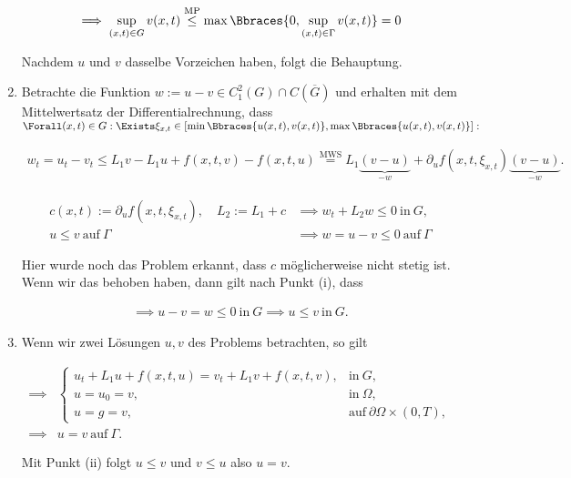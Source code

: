 \begin{solution}
\begin{enumerate}[label = (\roman*)]
  \begin{align*}
    \implies
    \sup_{(x, t) \in G} v(x, t)
    \stackrel{\mathrm{MP}}{\leq}
    \max \Bbraces{0, \sup_{(x, t) \in \Gamma} v(x,t)}
    =
    0
  \end{align*}

  Nachdem $u$ und $v$ dasselbe Vorzeichen haben, folgt die Behauptung.

  \item Betrachte die Funktion $w := u - v \in C_1^2(G) \cap C(\overline{G})$ und erhalten mit dem Mittelwertsatz der Differentialrechnung, dass $\Forall (x, t) \in G: \Exists \xi_{x, t} \in [\min \Bbraces{u(x, t), v(x, t)}, \max \Bbraces{u(x, t), v(x, t)}]:$

  \begin{align*}
    w_t
    =
    u_t - v_t
    \leq
    L_1 v - L_1 u + f(x, t, v) - f(x, t, u)
    \stackrel
    {
      \mathrm{MWS}
    }{=}
    L_1 \underbrace{(v - u)}_{-w} + \partial_u f(x, t, \xi_{x, t}) \underbrace{(v - u)}_{-w}.
  \end{align*}

  \begin{align*}
    c(x, t) := \partial_u f(x, t,\xi_{x, t}),
    \quad
    L_2 := L_1 + c
    & \implies
    w_t + L_2 w \leq 0 ~\text{in}~ G, \\
    u \leq v ~\text{auf}~ \Gamma
    & \implies
    w = u - v \leq 0 ~\text{auf}~ \Gamma
  \end{align*}

  Hier wurde noch das Problem erkannt, dass $c$ möglicherweise nicht stetig ist.
  Wenn wir das behoben haben, dann gilt nach Punkt (i), dass

  \begin{align*}
    \implies
    u - v = w \leq 0 ~\text{in}~ G
    \implies
    u \leq v ~\text{in}~ G.
  \end{align*}

  \item Wenn wir zwei Lösungen $u, v$ des Problems betrachten, so gilt 

  \begin{align*}
    \implies &
    \begin{cases}
      u_t + L_1 u + f(x, t, u) = v_t + L_1 v + f(x, t, v), & \text{in}~ G, \\
      u = u_0 = v,                                         & \text{in}~ \Omega, \\
      u = g = v,                                           & \text{auf}~ \partial \Omega \times (0, T),
    \end{cases} \\
    \implies &
    u = v ~\text{auf}~ \Gamma.
  \end{align*}

  Mit Punkt (ii) folgt $u \leq v$ und $v \leq u$ also $u = v$. 

\end{enumerate}

\end{solution}

